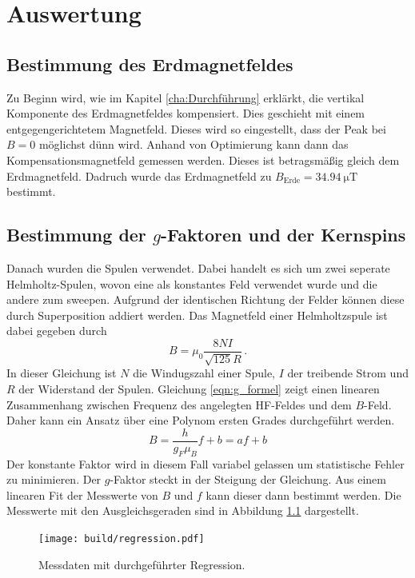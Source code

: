 \chapter{Auswertung}
\label{cha:Auswertung}

\section{Bestimmung des Erdmagnetfeldes}
\label{sec:erdmagnetfeld}
Zu Beginn wird, wie im Kapitel \ref{cha:Durchführung} erklärkt, die vertikal Komponente des Erdmagnetfeldes kompensiert. Dies geschieht mit einem entgegengerichtetem Magnetfeld. 
Dieses wird so eingestellt, dass der Peak bei $B = 0$ möglichst dünn wird. Anhand von Optimierung kann dann das Kompensationsmagnetfeld gemessen werden. Dieses ist betragsmäßig
gleich dem Erdmagnetfeld. Dadruch wurde das Erdmagnetfeld zu $B_\mathrm{Erde} = \qty{34.94}{\micro\tesla}$ bestimmt. 

\section{Bestimmung der $g$-Faktoren und der Kernspins}
\label{sec:kernspin}
Danach wurden die Spulen verwendet. Dabei handelt es sich um zwei seperate Helmholtz-Spulen, wovon eine als konstantes Feld verwendet wurde und die andere zum sweepen. 
Aufgrund der identischen Richtung der Felder können diese durch Superposition addiert werden. Das Magnetfeld einer Helmholtzspule ist dabei gegeben durch
\begin{equation}
    \label{eqn:helmholtz}
    B = \mu_0\frac{8NI}{\sqrt{125}R}\,.
\end{equation}
In dieser Gleichung ist $N$ die Windugszahl einer Spule, $I$ der treibende Strom und $R$ der Widerstand der Spulen. 
Gleichung \eqref{eqn:g_formel} zeigt einen linearen Zusammenhang zwischen Frequenz des angelegten HF-Feldes und dem $B$-Feld. Daher kann ein Ansatz über eine Polynom ersten Grades 
durchgeführt werden.
\begin{equation*}
    B = \frac{h}{g_F\mu_B}f + b = af + b 
\end{equation*}
Der konstante Faktor wird in diesem Fall variabel gelassen um statistische Fehler zu minimieren. Der $g$-Faktor steckt in der Steigung der Gleichung. Aus einem linearen Fit der Messwerte 
von $B$ und $f$ kann dieser dann bestimmt werden. Die Messwerte mit den Ausgleichsgeraden sind in Abbildung \ref{fig:Messung} dargestellt.

\begin{figure}
    \centering
    \texttt{[image: build/regression.pdf]}
    \caption{Messdaten mit durchgeführter Regression.}
    \label{fig:Messung}
\end{figure}

